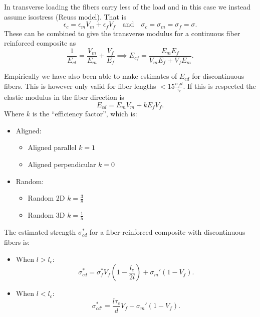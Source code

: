 In transverse loading the fibers carry less of the load and in this case we instead assume isostress (Reuss model). That is
\[ 
\epsilon_c = \epsilon_m V_m + \epsilon_f V_f \quad \text{and} \quad \sigma_c = \sigma_m = \sigma_f = \sigma
.\]
These can be combined to give the transverse modulus for a continuous fiber reinforced composite as
\[ 
\frac{1}{E_{ct}} = \frac{V_m}{E_m} + \frac{V_f}{E_f} \implies E_{cf} = \frac{E_m E_f}{V_m E_f + V_f E_m}
.\]

Empirically we have also been able to make estimates of $E_{cd}$ for discontinuous fibers. This is however only valid for fiber lengths $< 15 \frac{\sigma_f d}{\tau_c}$. If this is respected the elastic modulus in the fiber direction is
\[ 
E_{cd} = E_m V_m + k E_f V_f
.\]
Where $k$ is the ``efficiency factor'', which is:
\begin{itemize}
  \item Aligned:
    \begin{itemize}
      \item Aligned parallel $k = 1$
      \item Aligned perpendicular $k = 0$
    \end{itemize}
  \item Random:
    \begin{itemize}
      \item Random 2D $k = \frac{3}{8}$
      \item Random 3D $k = \frac{1}{5}$
    \end{itemize}
\end{itemize}

The estimated strength $\sigma_{cd}^{*}$ for a fiber-reinforced composite with discontinuous fibers is:
\begin{itemize}
  \item When $l > l_c$:
    \[ 
    \sigma_{cd}^{*} = \sigma_f^{*} V_f \left( 1 - \frac{l_c}{2l} \right) + \sigma_m' \left( 1 - V_f \right)
    .\]
  \item When $l < l_c$:
    \[ 
    \sigma_{cd'}^{*} = \frac{l \tau_c}{d} V_f + \sigma_m' \left( 1 - V_f \right)
    .\]
\end{itemize}
